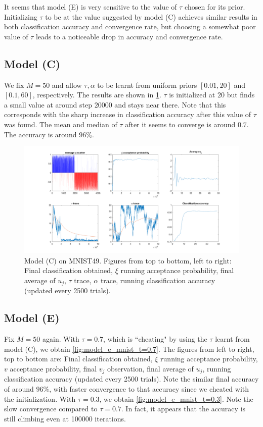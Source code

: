 \documentclass{siamart1116}
\begin{document}
            It seems that model (E) is very sensitive to the value of $\tau$ chosen for its prior. Initializing $\tau$ to be at the value suggested by model (C) achieves similar results in both classification accuracy and convergence rate, but choosing a somewhat poor value of $\tau$ leads to a noticeable drop in accuracy and convergence rate.
    \fi
    \subsection{Model (C)}
        We fix $M=50$ and allow $\tau, \alpha$ to be learnt from uniform priors $[0.01, 20]$ and $[0.1, 60]$, respectively. The results are shown in \cref{fig:model_c_mnist}. $\tau$ is initialized at $20$ but finds a small value at around step $20000$ and stays near there. Note that this corresponds with the sharp increase in classification accuracy after this value of $\tau$ was found. The mean and median of $\tau$ after it seems to converge is around $0.7$. The accuracy is around $96\%$.
        \begin{figure}[!htb]
            \centering
            \caption{\label{fig:model_c_mnist}Model (C) on MNIST49. Figures from top to bottom, left to right: Final classification obtained, $\xi$ running acceptance probability, final average of $u_j$, $\tau$ trace, $\alpha$ trace, running classification accuracy (updated every 2500 trials).}
            \includegraphics[width=0.48\linewidth]{model_c_vs_model_e/mnist/learn_t_a/all.png}
        \end{figure}
    \subsection{Model (E)}
        Fix $M=50$ again. 
        With $\tau = 0.7$, which is ``cheating" by using the $\tau$ learnt from model (C), we obtain \cref{fig:model_e_mnist_t=0.7}. The figures from left to right, top to bottom are: Final classification obtained, $\xi$ running acceptance probability, $v$ acceptance probability, final $v_j$ observation, final average of $u_j$, running classification accuracy (updated every 2500 trials). Note the similar final accuracy of around $96\%$, with faster convergence to that accuracy since we cheated with the initialization. With $\tau = 0.3$, we obtain \cref{fig:model_e_mnist_t=0.3}. Note the slow convergence compared to $\tau=0.7$. In fact, it appears that the accuracy is still climbing even at 100000 iterations.
\end{document}
